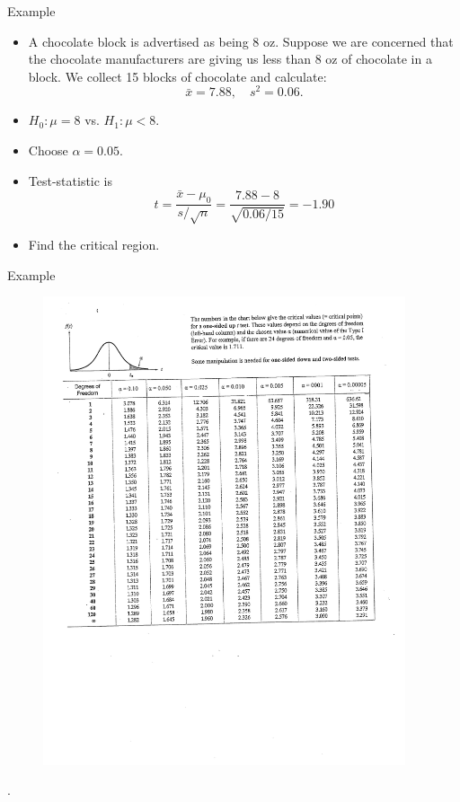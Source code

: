 \documentclass[10pt, xcolor=table]{beamer}
\begin{document}
\begin{frame}{Example}
\begin{itemize}
\setlength{\itemsep}{8pt}
\item A chocolate block is advertised as being 8 oz. Suppose we are concerned that the chocolate manufacturers are giving us less than 8 oz of chocolate in a block.  We collect 15 blocks of chocolate and calculate:
$$\bar{x} = 7.88, \quad s^2 = 0.06.$$
\item<1->[Step 1] $H_0: \mu = 8$ vs. $H_1: \mu < 8$.   
\item<2->[Step 2] Choose $\alpha = 0.05$. 
\item<3->[Step 3] Test-statistic is 
$$t = \frac{\bar{x} - \mu_0}{s/\sqrt{n}} = \frac{7.88 - 8}{\sqrt{0.06/15}} = -1.90$$
\item<4->[Step 4]  Find the critical region.
\end{itemize}
\end{frame}

\begin{frame}{Example}
\begin{figure}
\includegraphics[width = 0.95\textwidth]{images/rec11_2}
\end{figure}
.
\end{frame}
\end{document}
